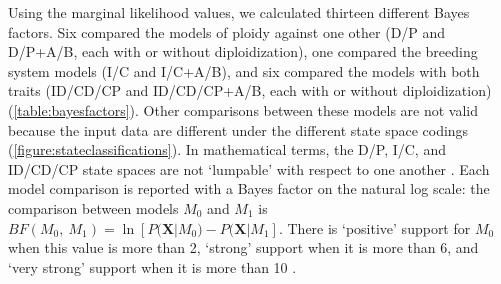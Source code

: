 Using the marginal likelihood values, we calculated thirteen different Bayes factors.
Six compared the models of ploidy against one other (D/P and D/P+A/B, each with or without diploidization), one compared the breeding system models (I/C and I/C+A/B), and six compared the models with both traits (ID/CD/CP and ID/CD/CP+A/B, each with or without diploidization) (\cref{table:bayesfactors}).
%
Other comparisons between these models are not valid because the input data are different under the different state space codings (\cref{figure:stateclassifications}).
In mathematical terms, the D/P, I/C, and ID/CD/CP state spaces are not `lumpable' with respect to one another \citep{tarasov_2019}.
Each model comparison is reported with a Bayes factor on the natural log scale: the comparison between models $M_0$ and $M_1$ is $BF(M_0,\ M_1) = \ln[ P(\mathbf{X} | M_0) - P(\mathbf{X} | M_1]$.
There is `positive' support for $M_0$ when this value is more than 2, `strong' support when it is more than 6, and `very strong' support when it is more than 10 \citep{kass1995}.


